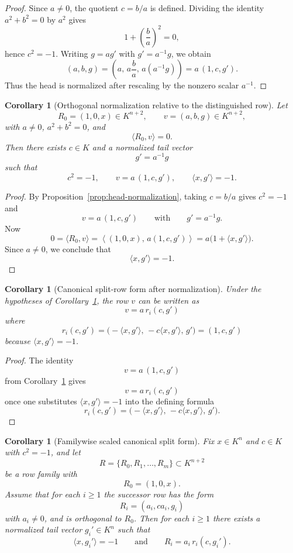 \documentclass[12pt]{article}
\newtheorem{cor}[theorem]{Corollary}
\begin{document}
\begin{proof}
Since $a\neq 0$, the quotient $c=b/a$ is defined. Dividing the identity $a^2+b^2=0$ by $a^2$ gives
\[
1+\left(\frac{b}{a}\right)^2 = 0,
\]
hence $c^2=-1$. Writing $g=a g'$ with $g'=a^{-1}g$, we obtain
\[
(a,b,g)
=
\left(a,\,a\frac{b}{a},\,a(a^{-1}g)\right)
=
a\,(1,c,g').
\]
Thus the head is normalized after rescaling by the nonzero scalar $a^{-1}$.
\end{proof}

\begin{cor}[Orthogonal normalization relative to the distinguished row]
\label{cor:head-normalization-orthogonal}
Let
\[
R_0=(1,0,x)\in K^{n+2},
\qquad
v=(a,b,g)\in K^{n+2},
\]
with $a\neq 0$, $a^2+b^2=0$, and
\[
\langle R_0,v\rangle = 0.
\]
Then there exists $c\in K$ and a normalized tail vector
\[
g' = a^{-1}g
\]
such that
\[
c^2=-1,
\qquad
v=a\,(1,c,g'),
\qquad
\langle x,g'\rangle = -1.
\]
\end{cor}

\begin{proof}
By Proposition~\ref{prop:head-normalization}, taking $c=b/a$ gives $c^2=-1$ and
\[
v=a\,(1,c,g')
\qquad\text{with}\qquad
g'=a^{-1}g.
\]
Now
\[
0=\langle R_0,v\rangle
=
\left\langle (1,0,x),\,a(1,c,g')\right\rangle
=
a\bigl(1+\langle x,g'\rangle\bigr).
\]
Since $a\neq 0$, we conclude that
\[
\langle x,g'\rangle = -1.
\]
\end{proof}

\begin{cor}[Canonical split-row form after normalization]
\label{cor:scaled-ri-normalization}
Under the hypotheses of Corollary~\ref{cor:head-normalization-orthogonal}, the row $v$ can be written as
\[
v = a\,r_i(c,g')
\]
where
\[
r_i(c,g')
=
\bigl(-\langle x,g'\rangle,\,-c\langle x,g'\rangle,\,g'\bigr)
=
(1,c,g')
\]
because $\langle x,g'\rangle=-1$.
\end{cor}

\begin{proof}
The identity
\[
v=a\,(1,c,g')
\]
from Corollary~\ref{cor:head-normalization-orthogonal} gives
\[
v=a\,r_i(c,g')
\]
once one substitutes $\langle x,g'\rangle=-1$ into the defining formula
\[
r_i(c,g')
=
\bigl(-\langle x,g'\rangle,\,-c\langle x,g'\rangle,\,g'\bigr).
\]
\end{proof}

\begin{cor}[Familywise scaled canonical split form]
\label{cor:familywise-scaled-ri}
Fix $x\in K^n$ and $c\in K$ with $c^2=-1$, and let
\[
R=\{R_0,R_1,\dots,R_m\}\subset K^{n+2}
\]
be a row family with
\[
R_0=(1,0,x).
\]
Assume that for each $i\ge 1$ the successor row has the form
\[
R_i=(a_i,c a_i,g_i)
\]
with $a_i\neq 0$, and is orthogonal to $R_0$. Then for each $i\ge 1$ there exists a normalized tail vector $g_i'\in K^n$ such that
\[
\langle x,g_i'\rangle=-1
\qquad\text{and}\qquad
R_i = a_i\,r_i(c,g_i').
\]
\end{cor}
\end{document}
